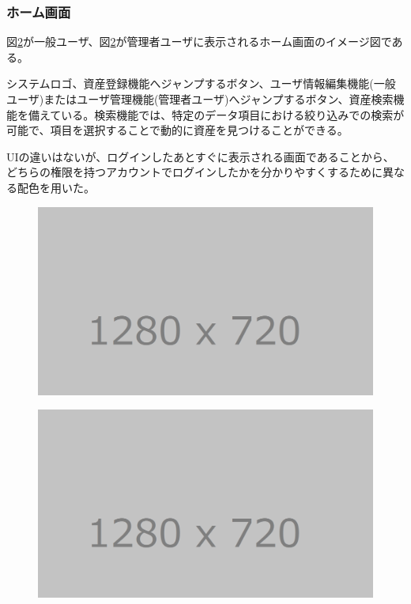 \documentclass[11ptm]{jsarticle}
\begin{document}
\subsubsection{ホーム画面}
\label{sec:ホーム画面}
図\ref{fig:}が一般ユーザ、図\ref{fig:}が管理者ユーザに表示されるホーム画面のイメージ図である。\par
システムロゴ、資産登録機能へジャンプするボタン、ユーザ情報編集機能(一般ユーザ)またはユーザ管理機能(管理者ユーザ)へジャンプするボタン、資産検索機能を備えている。検索機能では、特定のデータ項目における絞り込みでの検索が可能で、項目を選択することで動的に資産を見つけることができる。\par
UIの違いはないが、ログインしたあとすぐに表示される画面であることから、どちらの権限を持つアカウントでログインしたかを分かりやすくするために異なる配色を用いた。
\begin{figure}[h]
  \centering
  \includegraphics[keepaspectratio, width=0.8\linewidth]{source/tmp_picture.png}
  \caption{\label{fig:}}
\end{figure}
\begin{figure}[h]
  \centering
  \includegraphics[keepaspectratio, width=0.8\linewidth]{source/tmp_picture.png}
  \caption{\label{fig:}}
\end{figure}
\end{document}
